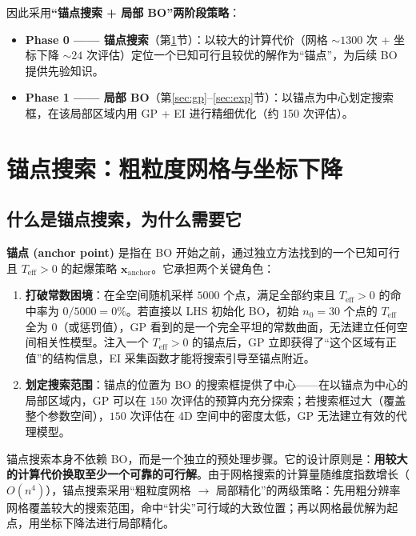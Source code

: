 \documentclass[12pt,a4paper]{ctexart}
\newcommand{\Teff}{T_{\text{eff}}}
\begin{document}
因此采用\textbf{``锚点搜索 + 局部 BO''两阶段策略}：

\begin{itemize}
    \item \textbf{Phase 0 —— 锚点搜索}（第\ref{sec:anchor}节）：以较大的计算代价（网格 $\sim 1300$ 次 + 坐标下降 $\sim 24$ 次评估）定位一个已知可行且较优的解作为``锚点''，为后续 BO 提供先验知识。
    \item \textbf{Phase 1 —— 局部 BO}（第\ref{sec:gp}--\ref{sec:exp}节）：以锚点为中心划定搜索框，在该局部区域内用 GP + EI 进行精细优化（约 150 次评估）。
\end{itemize}

\section{锚点搜索：粗粒度网格与坐标下降}
\label{sec:anchor}

\subsection{什么是锚点搜索，为什么需要它}

\textbf{锚点 (anchor point)} 是指在 BO 开始之前，通过独立方法找到的一个已知可行且 $\Teff > 0$ 的起爆策略 $\mathbf{x}_{\text{anchor}}$。它承担两个关键角色：

\begin{enumerate}[label=(\arabic*), leftmargin=*]
    \item \textbf{打破常数困境}：在全空间随机采样 $5000$ 个点，满足全部约束且 $\Teff > 0$ 的命中率为 $0/5000 = 0\%$。若直接以 LHS 初始化 BO，初始 $n_0 = 30$ 个点的 $\Teff$ 全为 0（或惩罚值），GP 看到的是一个完全平坦的常数曲面，无法建立任何空间相关性模型。注入一个 $\Teff > 0$ 的锚点后，GP 立即获得了``这个区域有正值''的结构信息，EI 采集函数才能将搜索引导至锚点附近。
    \item \textbf{划定搜索范围}：锚点的位置为 BO 的搜索框提供了中心——在以锚点为中心的局部区域内，GP 可以在 $150$ 次评估的预算内充分探索；若搜索框过大（覆盖整个参数空间），$150$ 次评估在 4D 空间中的密度太低，GP 无法建立有效的代理模型。
\end{enumerate}

锚点搜索本身不依赖 BO，而是一个独立的预处理步骤。它的设计原则是：\textbf{用较大的计算代价换取至少一个可靠的可行解}。由于网格搜索的计算量随维度指数增长（$O(n^4)$），锚点搜索采用``粗粒度网格 $\to$ 局部精化''的两级策略：先用粗分辨率网格覆盖较大的搜索范围，命中``针尖''可行域的大致位置；再以网格最优解为起点，用坐标下降法进行局部精化。
\end{document}
